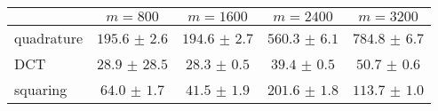 \centering
\renewcommand{\arraystretch}{1.2}
\begin{tabular}{@{}lcccc@{}}
\toprule
 & $m=800$ & $m=1600$ & $m=2400$ & $m=3200$\\
\midrule
quadrature & $195.6$ $\pm$ $2.6$ & $194.6$ $\pm$ $2.7$ & $560.3$ $\pm$ $6.1$ & $784.8$ $\pm$ $6.7$ \\
DCT & $28.9$ $\pm$ $28.5$ & $28.3$ $\pm$ $0.5$ & $39.4$ $\pm$ $0.5$ & $50.7$ $\pm$ $0.6$ \\
squaring & $64.0$ $\pm$ $1.7$ & $41.5$ $\pm$ $1.9$ & $201.6$ $\pm$ $1.8$ & $113.7$ $\pm$ $1.0$ \\
\bottomrule
\end{tabular}
